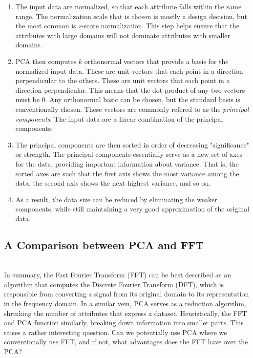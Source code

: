 \documentclass{amsproc}
\begin{document}
\begin{enumerate}
	\item The input data are normalized, so that each attribute falls within the same range. The normalization scale that is chosen is mostly a design decision, but the most common is $z$-score normalization. This step helps ensure that the attributes with large domains will not dominate attributes with smaller domains.
	\item PCA then computes $k$ orthonormal vectors that provide a basis for the normalized input data. These are unit vectors that each point in a direction perpendicular to the others. These are unit vectors that each point in a direction perpendicular. This means that the dot-product of any two vectors must be $0$. Any orthonormal basic can be chosen, but the standard  basis is conventionally chosen. These vectors are commonly refered to as the \textit{principal components}. The input data are a linear combination of the principal components.
	\item The principal components are then sorted in order of decreasing "significance" or strength. The principal components essentially serve as a new set of axes for the data, providing important information about variance. That is, the sorted axes are such that the first axis shows the most variance among the data, the second axis shows the next highest variance, and so on.
	\item As a result, the data size can be reduced by eliminating the weaker components, while still maintaining a very good approximation of the original data.

\end{enumerate}

\subsection{A Comparison between PCA and FFT}

\mbox{}	 \\
\indent In summary, the Fast Fourier Transform (FFT) can be best described as an algorithm that computes the Discrete Fourier Transform (DFT), which is responsible from converting a signal from its original domain to its representation in the frequency domain. In a similar vein, PCA serves as a reduction algorithm, shrinking the number of attributes that express a dataset. Heuristically, the FFT and PCA function similarly, breaking down information into smaller parts. This raises a rather interesting question. Can we potentially use PCA where we conventionally use FFT, and if not, what advantages does the FFT have over the PCA?
\end{document}

